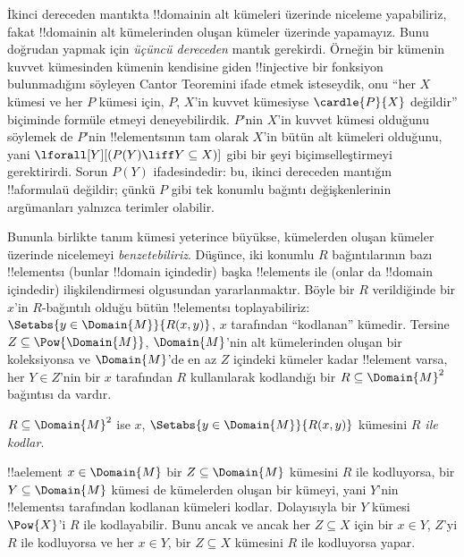 \documentclass[../../../include/open-logic-section]{subfiles}
\begin{document}


\begin{explain}
İkinci dereceden mantıkta !!{domain}{}in alt kümeleri üzerinde niceleme
yapabiliriz, fakat !!{domain}{}in alt kümelerinden oluşan kümeler üzerinde
yapamayız. Bunu doğrudan yapmak için \emph{üçüncü dereceden} mantık
gerekirdi. Örneğin bir kümenin kuvvet kümesinden kümenin kendisine giden
!!{injective} bir fonksiyon bulunmadığını söyleyen Cantor Teoremini ifade etmek
isteseydik, onu ``her $X$ kümesi ve her $P$ kümesi için, $P$, $X$'in kuvvet
kümesiyse $\cardle{P}{X}$ değildir'' biçiminde formüle etmeyi deneyebilirdik.
$P$'nin $X$'in kuvvet kümesi olduğunu söylemek de $P$'nin !!{element}s{}ının
tam olarak $X$'in bütün alt kümeleri olduğunu, yani
$\lforall[Y][(P(Y)\liff Y\subseteq X)]$ gibi bir şeyi biçimselleştirmeyi
gerektirirdi. Sorun $P(Y)$ ifadesindedir: bu, ikinci dereceden mantığın
!!a{formula}{}ü değildir; çünkü $P$ gibi tek konumlu bağıntı değişkenlerinin
argümanları yalnızca terimler olabilir.

Bununla birlikte tanım kümesi yeterince büyükse, kümelerden oluşan kümeler
üzerinde nicelemeyi \emph{benzetebiliriz}. Düşünce, iki konumlu $R$
bağıntılarının bazı !!{element}s{}ı (bunlar !!{domain} içindedir) başka
!!{element}s ile (onlar da !!{domain} içindedir) ilişkilendirmesi olgusundan
yararlanmaktır. Böyle bir $R$ verildiğinde bir $x$'in $R$-bağıntılı olduğu
bütün !!{element}s{}ı toplayabiliriz:
$\Setabs{y\in\Domain{M}}{R(x,y)}$, $x$ tarafından ``kodlanan'' kümedir.
Tersine $Z\subseteq\Pow{\Domain{M}}$, $\Domain{M}$'nin alt kümelerinden oluşan
bir koleksiyonsa ve $\Domain{M}$'de en az $Z$ içindeki kümeler kadar
!!{element} varsa, her $Y\in Z$'nin bir $x$ tarafından $R$ kullanılarak
kodlandığı bir $R\subseteq\Domain{M}^2$ bağıntısı da vardır.
\end{explain}

\begin{defn}
$R\subseteq\Domain{M}^2$ ise $x$, $\Setabs{y\in\Domain{M}}{R(x,y)}$ kümesini
\emph{$R$ ile kodlar}.
\end{defn}

!!a{element} $x\in\Domain{M}$ bir $Z\subseteq\Domain{M}$ kümesini $R$ ile
kodluyorsa, bir $Y\subseteq\Domain{M}$ kümesi de kümelerden oluşan bir
kümeyi, yani $Y$'nin !!{element}s{}ı tarafından kodlanan kümeleri kodlar.
Dolayısıyla bir $Y$ kümesi $\Pow{X}$'i $R$ ile kodlayabilir. Bunu ancak ve
ancak her $Z\subseteq X$ için bir $x\in Y$, $Z$'yi $R$ ile kodluyorsa ve her
$x\in Y$, bir $Z\subseteq X$ kümesini $R$ ile kodluyorsa yapar.
\end{document}
